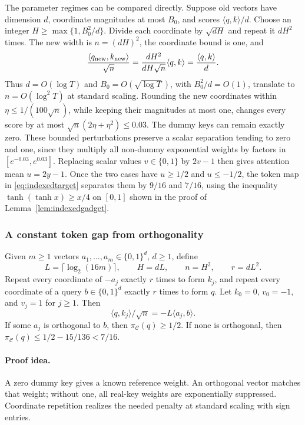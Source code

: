 \begin{remark}
The parameter regimes can be compared directly. Suppose old vectors
have dimension $d$, coordinate magnitudes at most $B_0$, and scores
$\langle q,k\rangle/d$. Choose an integer $H\ge\max\{1,B_0^2/d\}$.
Divide each coordinate by $\sqrt{dH}$ and repeat it $dH^2$ times.
The new width is $n=(dH)^2$, the coordinate bound is one, and
\[
 \frac{\langle q_{\rm new},k_{\rm new}\rangle}{\sqrt n}
 =\frac{dH^2}{dH\sqrt n}\langle q,k\rangle
 =\frac{\langle q,k\rangle}{d}.
\]
Thus $d=O(\log T)$ and $B_0=O(\sqrt{\log T})$, with
$B_0^2/d=O(1)$, translate to $n=O(\log^2T)$ at standard scaling.
Rounding the new coordinates within
$\eta\le1/(100\sqrt n)$, while keeping their magnitudes at most one,
changes every score by at most
$\sqrt n(2\eta+\eta^2)\le0.03$.
The dummy keys can remain exactly zero. These bounded perturbations
preserve a scalar separation tending to zero and one, since they
multiply all non-dummy exponential weights by factors in
$[e^{-0.03},e^{0.03}]$. Replacing scalar values $v\in\{0,1\}$ by
$2v-1$ then gives attention mean $u=2y-1$. Once the two cases have
$u\ge1/2$ and $u\le-1/2$, the token map in
\eqref{eq:indexedtarget} separates them by $9/16$ and $7/16$, using the
inequality $\tanh(\tanh x)\ge x/4$ on $[0,1]$ shown in the proof of
Lemma~\ref{lem:indexedgadget}.
\end{remark}

\subsubsection{A constant token gap from orthogonality}

\begin{lemma}
\label{lem:indexedgadget}
Given $m\ge1$ vectors $a_1,\ldots,a_m\in\{0,1\}^d$, $d\ge1$, define
\[
 L=\lceil\log_2(16m)\rceil,\qquad
 H=dL,\qquad n=H^2,\qquad r=dL^2.
\]
Repeat every coordinate of $-a_j$ exactly $r$ times to form $k_j$, and
repeat every coordinate of a query $b\in\{0,1\}^d$ exactly $r$ times
to form $q$.  Let $k_0=0$, $v_0=-1$, and $v_j=1$ for $j\ge1$.
Then
\[
 \langle q,k_j\rangle/\sqrt n=-L\langle a_j,b\rangle.
\]
If some $a_j$ is orthogonal to $b$, then
$\pi_{\mathcal C}(q)\ge1/2$.  If none is orthogonal, then
$\pi_{\mathcal C}(q)\le1/2-15/136<7/16$.
\end{lemma}

\paragraph{Proof idea.}
A zero dummy key gives a known reference weight.  An orthogonal vector matches that weight; without one, all real-key weights are exponentially suppressed.  Coordinate repetition realizes the needed penalty at standard scaling with sign entries.

